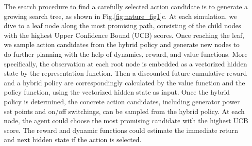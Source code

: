 The search procedure to find a carefully selected action candidate is to generate a growing search tree, as shown in Fig.\ref{fig:nature_fig1}c. At each simulation, we dive to a leaf node along the most promising path, consisting of the child nodes with the highest Upper Confidence Bound (UCB) scores. Once reaching the leaf, we sample action candidates from the hybrid policy and generate new nodes to do further planning with the help of dynamics, reward, and value functions. More specifically, the observation at each root node is embedded as a vectorized hidden state by the representation function. Then a discounted future cumulative reward and a hybrid policy are correspondingly calculated by the value function and the policy function, using the vectorized hidden state as input. Once the hybrid policy is determined, the concrete action candidates, including generator power set points and on/off switchings, can be sampled from the hybrid policy. At each node, the agent could choose the most promising candidate with the highest UCB score. The reward and dynamic functions could estimate the immediate return and next hidden state if the action is selected.


